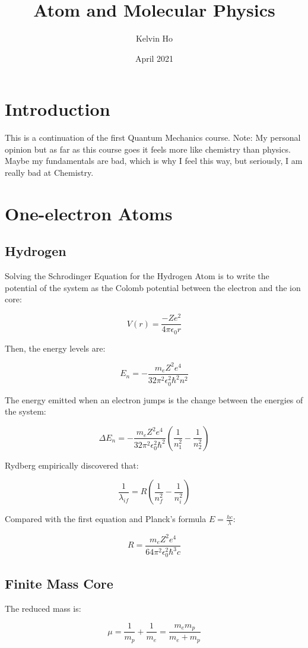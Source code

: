 \documentclass[12pt]{article}
\title{Atom and Molecular Physics}
\author{Kelvin Ho}
\date{April 2021}
\begin{document}
\maketitle

\section{Introduction}
This is a continuation of the first Quantum Mechanics course. Note: My personal opinion but as far as this course goes it feels more like chemistry than physics. Maybe my fundamentals are bad, which is why I feel this way, but seriously, I am really bad at Chemistry.

\section{One-electron Atoms}

\subsection{Hydrogen}

Solving the Schrodinger Equation for the Hydrogen Atom is to write the potential of the system as the Colomb potential between the electron and the ion core:

\[V(r) = \frac{-Ze^2}{4\pi\epsilon_0r}\]

Then, the energy levels are:

\[ E_n = -\frac{m_eZ^2e^4}{32\pi^2\epsilon_0^2\hbar^2n^2}\]

The energy emitted when an electron jumps is the change between the energies of the system:

\[\Delta E_n = -\frac{m_eZ^2e^4}{32\pi^2\epsilon_0^2\hbar^2}\left(\frac{1}{n_1^2} - \frac{1}{n_2^2}\right)\]

Rydberg empirically discovered that:

\[\frac{1}{\lambda_{if}} = R\left(\frac{1}{n_f^2} - \frac{1}{n_i^2}\right)\]

Compared with the first equation and Planck's formula $E = \frac{hc}{\lambda}$:

\[ R = \frac{m_eZ^2e^4}{64\pi^2\epsilon_0^2\hbar^3c}\]


\subsection{Finite Mass Core}
The reduced mass is:

\[\mu = \frac{1}{m_p} + \frac{1}{m_e} = \frac{m_e m_p}{m_e + m_p}\]
\end{document}
